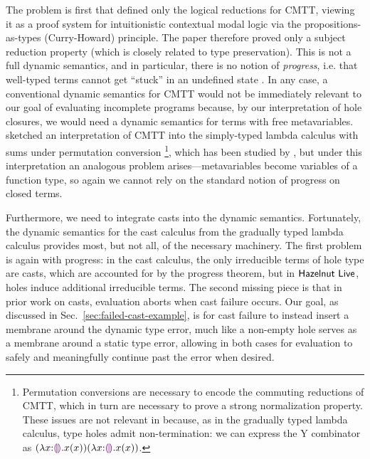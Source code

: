 The problem is first that \citet{Nanevski2008} defined only the logical reductions for CMTT, viewing it as a proof system for intuitionistic contextual modal logic via the propositions-as-types (Curry-Howard) principle. 
The paper therefore proved only a subject reduction property (which is closely related to type preservation). 
This is not a full dynamic semantics, and in particular, there is no notion of \emph{progress}, i.e. that well-typed terms cannot get ``stuck'' in an undefined state \cite{wright94:_type_soundness}. 
In any case, a conventional dynamic semantics for CMTT would not be immediately relevant to our goal of evaluating incomplete programs because, by our interpretation of hole closures, we would need a dynamic semantics for terms with free metavariables. 
\citet{Nanevski2008} sketched an interpretation of CMTT into the simply-typed lambda calculus with sums under permutation conversion%
\footnote{Permutation conversions are necessary to encode the commuting reductions of CMTT, which in turn are necessary to prove a strong normalization property. These issues are not relevant in \HazelnutLive because, as in the gradually typed lambda calculus, type holes admit non-termination: we can express the Y combinator as $(\lambda x{:}\textcolor{violet}{\llparenthesis}\textcolor{violet}{\rrparenthesis}.x(x)) (\lambda x{:}\textcolor{violet}{\llparenthesis}\textcolor{violet}{\rrparenthesis}.x(x))$.}, 
which has been studied by \citet{DBLP:journals/iandc/Groote02}, 
but under this interpretation an analogous problem arises---metavariables become variables of a function type, so again we cannot rely on the standard notion of progress on closed terms.%

Furthermore, we need to integrate casts into the dynamic semantics. 
Fortunately, the dynamic semantics for the cast calculus from the gradually typed lambda calculus provides most, but not all, of the necessary machinery. 
The first problem is again with progress: in the cast calculus, the only irreducible terms of hole type are casts, which are accounted for by the progress theorem, but in $\textsf{Hazelnut Live}$, holes induce additional irreducible terms. 
The second missing piece is that in prior work on casts, evaluation aborts when cast failure occurs. 
Our goal, as discussed in Sec.~\ref{sec:failed-cast-example}, is for cast failure to instead insert a membrane around the dynamic type error, 
much like a non-empty hole serves as a membrane around a static type error, 
allowing in both cases for evaluation to safely and meaningfully continue past the error when desired.

